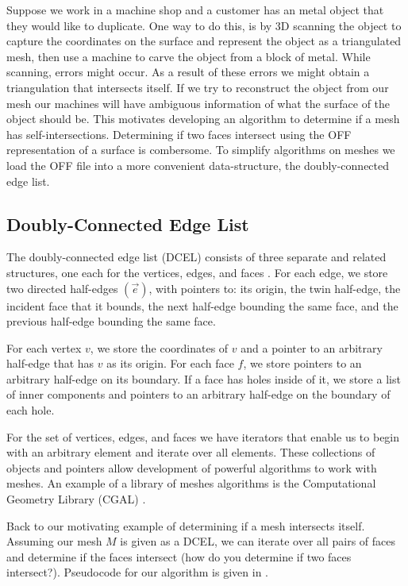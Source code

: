 Suppose we work in a machine shop and a customer has an metal object that they would like
to duplicate.
One way to do this, is by 3D scanning the object to capture the coordinates on the 
surface and represent the object as a triangulated mesh, then use a machine to carve the object
from a block of metal. 
While scanning, errors might occur. As a result of these errors
we might obtain a triangulation that intersects itself. If we try to reconstruct the object
from our mesh our machines will have ambiguous information of what the surface of the object
should be.
This motivates developing an algorithm to determine if a mesh has self-intersections.
Determining if two faces intersect using the OFF representation of a surface is combersome.
To simplify algorithms on meshes we load the OFF file into a more convenient data-structure,
the doubly-connected edge list.

\subsection{Doubly-Connected Edge List}

The doubly-connected edge list (DCEL) consists of three separate and related structures, one each
for the vertices, edges, and faces \cite{dutchbook3}.
For each edge, we store two directed half-edges $(\overrightarrow{e})$, with pointers to: its origin, the twin half-edge, the incident face that it bounds, the next half-edge bounding the same face, and the previous half-edge bounding the same face.


For each vertex $v$, we store the coordinates of $v$ and a pointer to an arbitrary half-edge
that has $v$ as its origin.
For each face $f$, we store pointers to an arbitrary half-edge on its boundary. If a face has holes inside of it, we store a list of inner components and pointers to an arbitrary half-edge  on the boundary of each hole.

For the set of vertices, edges, and faces we have iterators that enable us to begin with an arbitrary element
and iterate over all elements. These collections of objects and pointers allow development of
powerful algorithms to work with meshes. An example of a library of meshes algorithms
is the Computational Geometry Library (CGAL) \cite{cgal, cgal:eb-24b}. 

Back to our motivating example of determining if a mesh intersects itself. 
Assuming our mesh $M$ is given as a DCEL, we can iterate over all pairs of faces
and determine if the faces intersect (how do you determine if two faces intersect?).
Pseudocode for our algorithm is given in .


